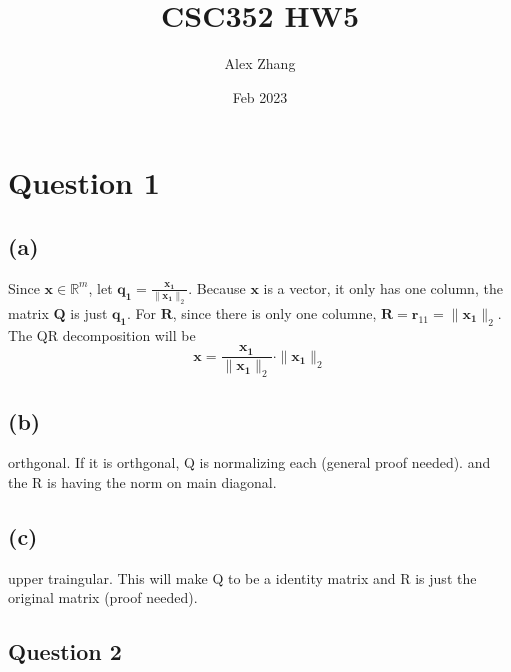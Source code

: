 \documentclass{article}
\title{CSC352 HW5}
\author{Alex Zhang}
\date{Feb 2023}
\newcommand{\mat}[1]{\mathbf{#1}}
\begin{document}
\maketitle

\section*{Question 1}

\subsection*{(a)}
Since $\mat{x} \in \mathbb{R}^m$, let $\mat{q_1} = \frac{\mat{x_1}}{\|\mat{x_1}\|_2}$. Because $\mat{x}$ is a vector, it only has one column, the
matrix $\mat{Q}$ is just $\mat{q_1}$. For $\mat{R}$, since there is only one columne, $\mat{R} = \mat{r}_{11} = \|\mat{x_1} \|_2$. The QR
decomposition will be 
$$\mat{x} = \frac{\mat{x_1}}{\|\mat{x_1}\|_2} \cdot  \|\mat{x_1} \|_2$$

\subsection*{(b)}
orthgonal. If it is orthgonal, Q is normalizing each (general proof needed). and the R is having the norm on main diagonal.


\subsection*{(c)}
upper traingular. This will make Q to be a identity matrix and R is just the original matrix (proof needed).

\subsection*{Question 2}
\end{document}
